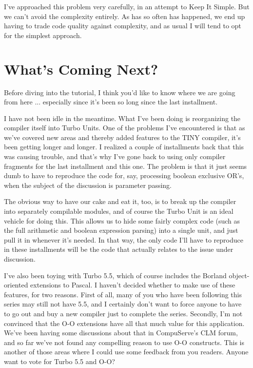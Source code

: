 I've approached this problem very  carefully, in  an  attempt to Keep It Simple. But we can't avoid the complexity entirely. As has so often has happened, we end up having to trade code quality against complexity, and  as  usual  I  will  tend to opt for the simplest approach.

\section{What's Coming Next?}

Before diving into the tutorial, I think you'd like to know where we are going  from  here  ... especially since it's been so long since the last installment.

I have not been idle in  the  meantime. What I've been doing is reorganizing  the  compiler  itself into Turbo Units. One of the problems I've encountered is that  as we've covered new areas and thereby added features to  the  TINY  compiler, it's been getting longer and longer. I realized a couple of installments back that this was causing trouble, and that's why I've gone back  to using only compiler fragments for  the  last  installment and this one. The problem is that it just  seems  dumb to have to reproduce the code  for, say, processing  boolean  exclusive  OR's, when the subject of the discussion is parameter passing.

The obvious way  to have our cake and eat it, too, is to break up the compiler into separately compilable  modules, and  of course the Turbo Unit is an ideal  vehicle  for doing this. This allows us to hide some fairly complex code (such as the  full arithmetic and boolean expression parsing) into a single unit, and just pull it in whenever it's needed. In that way, the only code I'll have to reproduce in these installments will be the code that actually relates to the issue under discussion.

I've  also  been  toying with Turbo 5.5, which of course includes the Borland object-oriented  extensions  to  Pascal. I haven't decided whether to make use of these features, for  two reasons. First of all, many of you who have been following this series may still not have 5.5, and I certainly don't want to force anyone to have to go out and  buy  a  new  compiler  just  to  complete the series. Secondly, I'm not convinced that the O-O extensions have all that much value for this application. We've been having some discussions  about that in CompuServe's CLM  forum, and  so  far we've  not found any compelling reason  to  use  O-O  constructs. This is another of those areas where I could  use  some  feedback from you readers. Anyone want to vote for Turbo 5.5 and O-O?

